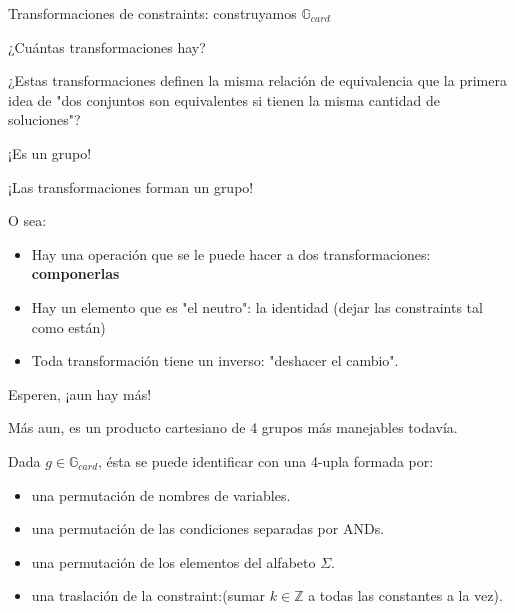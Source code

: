 \documentclass[10pt]{beamer}
\begin{document}
\begin{frame}{Transformaciones de constraints: construyamos $\mathbb{G}_{card}$}
\begin{itemize}
¿Cuántas transformaciones hay?

¿Estas transformaciones definen la misma relación de equivalencia que la primera idea de "dos conjuntos son equivalentes si tienen la misma cantidad de soluciones"?


	
\end{itemize}


\end{frame}

\begin{frame}{¡Es un grupo!}

¡Las transformaciones forman un grupo!

O sea:

\begin{itemize}
	\item Hay una operación que se le puede hacer a dos transformaciones: \textbf{componerlas}
	\item Hay un elemento que es "el neutro": la identidad (dejar las constraints tal como están)
	\item Toda transformación tiene un inverso: "deshacer el cambio".
\end{itemize}

\end{frame}

\begin{frame}{Esperen, ¡aun hay más!}

Más aun, es un producto cartesiano de 4 grupos más manejables todavía.

Dada $g \in \mathbb{G}_{card}$, ésta se puede identificar con una 4-upla formada por:
\begin{itemize}
	\item una permutación de nombres de variables.
	\item una permutación de las condiciones separadas por ANDs.
	\item una permutación de los elementos del alfabeto $\Sigma$.
	\item una traslación de la constraint:(sumar $k \in \mathbb{Z}$ a todas las constantes a la vez).
\end{itemize}

\end{frame}
\end{document}
